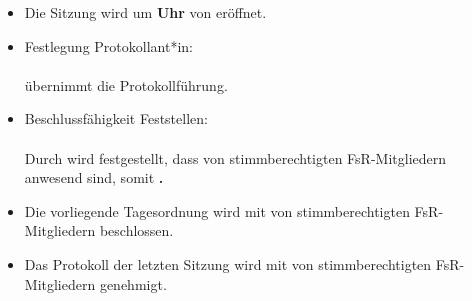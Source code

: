  
  \begin{itemize}
    \item {Die Sitzung wird um \textbf{\meetingStartTime \space Uhr} von \textbf{\chair} eröffnet.}

    \item {Festlegung Protokollant*in: \\ \\
      \textbf{\recorder} übernimmt die Protokollführung.}

    \item {Beschlussfähigkeit Feststellen: \\ \\
      Durch \textbf{\chair} wird festgestellt, dass
      \textbf{\meetingAttendence} von \textbf{\meetingAttendenceMax}
      stimmberechtigten FsR-Mitgliedern anwesend sind, somit \textbf{\quorum.}}
    
  \item Die vorliegende Tagesordnung wird mit \textbf{\approvalTO} von \textbf{\meetingAttendence} stimmberechtigten FsR-Mitgliedern beschlossen.

\item Das Protokoll der letzten Sitzung wird mit \textbf{\approvalProtocol} von \textbf{\meetingAttendence} 
      stimmberechtigten FsR-Mitgliedern genehmigt.
  \end{itemize}
